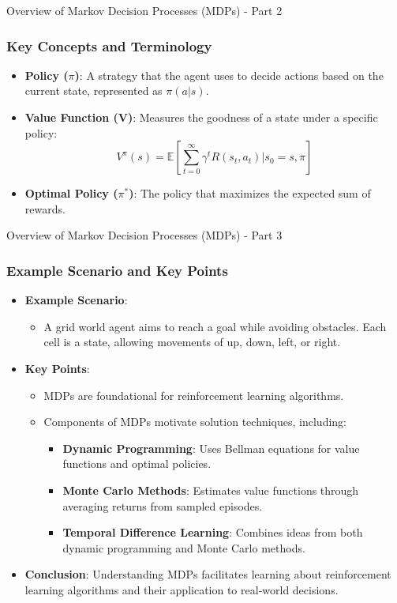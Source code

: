 \documentclass[aspectratio=169]{beamer}
\begin{document}
\begin{frame}[fragile]{Overview of Markov Decision Processes (MDPs) - Part 2}
    \frametitle{Key Concepts and Terminology}
    \begin{itemize}
        \item \textbf{Policy (\(\pi\))}: A strategy that the agent uses to decide actions based on the current state, represented as \(\pi(a|s)\).
        \item \textbf{Value Function (V)}: Measures the goodness of a state under a specific policy:
        \[
        V^{\pi}(s) = \mathbb{E} \left[ \sum_{t=0}^{\infty} \gamma^t R(s_t, a_t) \big| s_0 = s, \pi \right]
        \]
        \item \textbf{Optimal Policy (\(\pi^*\))}: The policy that maximizes the expected sum of rewards.
    \end{itemize}
\end{frame}

\begin{frame}[fragile]{Overview of Markov Decision Processes (MDPs) - Part 3}
    \frametitle{Example Scenario and Key Points}
    \begin{itemize}
        \item \textbf{Example Scenario}: 
        \begin{itemize}
            \item A grid world agent aims to reach a goal while avoiding obstacles. Each cell is a state, allowing movements of up, down, left, or right.
        \end{itemize}
        \item \textbf{Key Points}:
        \begin{itemize}
            \item MDPs are foundational for reinforcement learning algorithms.
            \item Components of MDPs motivate solution techniques, including:
            \begin{itemize}
                \item \textbf{Dynamic Programming}: Uses Bellman equations for value functions and optimal policies.
                \item \textbf{Monte Carlo Methods}: Estimates value functions through averaging returns from sampled episodes.
                \item \textbf{Temporal Difference Learning}: Combines ideas from both dynamic programming and Monte Carlo methods.
            \end{itemize}
        \end{itemize}
        \item \textbf{Conclusion}: Understanding MDPs facilitates learning about reinforcement learning algorithms and their application to real-world decisions.
    \end{itemize}
\end{frame}
\end{document}
